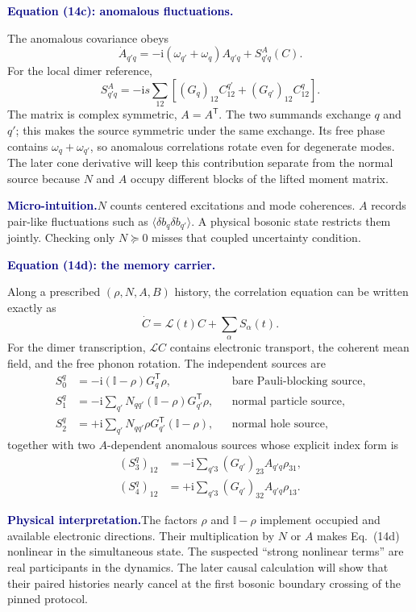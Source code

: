 \documentclass[10pt]{article}
\newcommand{\ii}{\mathrm i}
\newcommand{\I}{\mathbb I}
\newcommand{\pedbox}[2]{%
  \par\medskip
  \noindent\colorbox{pale}{%
    \parbox{\dimexpr\linewidth-2\fboxsep\relax}{%
      \textcolor{navy}{\textbf{#1}}\quad #2%
    }%
  }\par\medskip
}
\newcommand{\intuition}[1]{\pedbox{Micro-intuition.}{#1}}
\newcommand{\physicalbox}[1]{\pedbox{Physical interpretation.}{#1}}
\newcommand{\flowlead}[1]{%
  \par\medskip
  \needspace{3\baselineskip}%
  \noindent\textcolor{navy}{\textbf{#1.}}\enspace\ignorespaces
}
\begin{document}
\flowlead{Equation (14c): anomalous fluctuations}

The anomalous covariance obeys
\[
\dot A_{q'q}
=-\ii(\omega_{q'}+\omega_q)A_{q'q}
+S^A_{q'q}(C).
\tag{14c$'$}
\]
For the local dimer reference,
\[
S^A_{q'q}
=-\ii s\sum_{12}
\left[(G_q)_{12}C^{q'}_{12}
      +(G_{q'})_{12}C^q_{12}\right].
\tag{2.2}
\]
The matrix is complex symmetric, \(A=A^{\mathsf T}\).
The two summands exchange \(q\) and \(q'\); this makes the source symmetric
under the same exchange.  Its free phase contains
\(\omega_q+\omega_{q'}\), so anomalous correlations rotate even for
degenerate modes.  The later cone derivative will keep this contribution
separate from the normal source because \(N\) and \(A\) occupy different
blocks of the lifted moment matrix.

\intuition{\(N\) counts centered excitations and mode coherences.
\(A\) records pair-like fluctuations such as
\(\langle\delta b_q\delta b_{q'}\rangle\).  A physical bosonic state restricts
them jointly.  Checking only \(N\succeq0\) misses that coupled uncertainty
condition.}

\flowlead{Equation (14d): the memory carrier}

Along a prescribed \((\rho,N,A,B)\) history, the correlation equation can be
written exactly as
\[
\dot C=\mathcal L(t)C+\sum_{\alpha}S_\alpha(t).
\tag{2.3}
\]
For the dimer transcription, \(\mathcal L C\) contains electronic transport,
the coherent mean field, and the free phonon rotation.  The independent
sources are
\[
\begin{aligned}
S_0^q&=-\ii(\I-\rho)G_q^{\mathsf T}\rho,
&&\text{bare Pauli-blocking source},\\
S_1^q&=-\ii\sum_{q'}N_{qq'}
(\I-\rho)G_{q'}^{\mathsf T}\rho,
&&\text{normal particle source},\\
S_2^q&=+\ii\sum_{q'}N_{qq'}
\rho G_{q'}^{\mathsf T}(\I-\rho),
&&\text{normal hole source},
\end{aligned}
\tag{2.4}
\]
together with two \(A\)-dependent anomalous sources whose explicit index form
is
\[
\begin{aligned}
(S_3^q)_{12}
&=-\ii\sum_{q'3}(G_{q'})_{23}A_{q'q}\rho_{31},\\
(S_4^q)_{12}
&=+\ii\sum_{q'3}(G_{q'})_{32}A_{q'q}\rho_{13}.
\end{aligned}
\tag{2.5}
\]

\physicalbox{The factors \(\rho\) and \(\I-\rho\) implement occupied and
available electronic directions.  Their multiplication by \(N\) or \(A\)
makes Eq.~(14d) nonlinear in the simultaneous state.  The suspected ``strong
nonlinear terms'' are real participants in the dynamics.  The later causal
calculation will show that their paired histories nearly cancel at the first
bosonic boundary crossing of the pinned protocol.}
\end{document}
